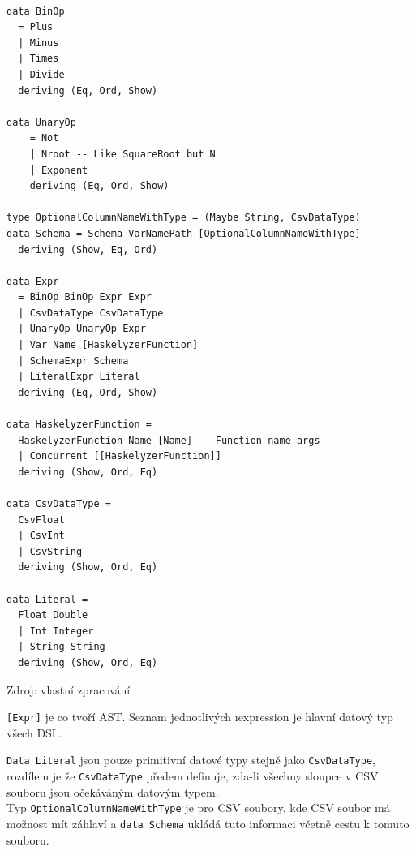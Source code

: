 \documentclass[male,czech]{kithesis}
\newcommand{\haskellInline}[1]{\colorbox{gray!10}{\texttt{#1}}}
\begin{document}
\begin{verbatim}

data BinOp
  = Plus
  | Minus
  | Times
  | Divide
  deriving (Eq, Ord, Show)

data UnaryOp
    = Not
    | Nroot -- Like SquareRoot but N 
    | Exponent
    deriving (Eq, Ord, Show)

type OptionalColumnNameWithType = (Maybe String, CsvDataType)
data Schema = Schema VarNamePath [OptionalColumnNameWithType] 
  deriving (Show, Eq, Ord)

data Expr
  = BinOp BinOp Expr Expr
  | CsvDataType CsvDataType 
  | UnaryOp UnaryOp Expr 
  | Var Name [HaskelyzerFunction]
  | SchemaExpr Schema 
  | LiteralExpr Literal
  deriving (Eq, Ord, Show)

data HaskelyzerFunction = 
  HaskelyzerFunction Name [Name] -- Function name args
  | Concurrent [[HaskelyzerFunction]]
  deriving (Show, Ord, Eq)

data CsvDataType = 
  CsvFloat 
  | CsvInt 
  | CsvString 
  deriving (Show, Ord, Eq)

data Literal = 
  Float Double 
  | Int Integer
  | String String
  deriving (Show, Ord, Eq)

\end{verbatim}

{
\begin{center}
Zdroj: vlastní zpracování
\end{center}
}

\haskellInline{[Expr]} je co tvoří AST.
Seznam jednotlivých \i{expression} je hlavní datový typ všech DSL. 

\haskellInline{Data Literal} jsou pouze primitivní datové typy stejně jako
\haskellInline{CsvDataType}, 
rozdílem je že \haskellInline{CsvDataType} předem definuje, 
zda-li všechny sloupce v CSV souboru jsou očekáváným datovým typem. \\
Typ \haskellInline{OptionalColumnNameWithType} je pro CSV soubory, 
kde CSV soubor má možnost
mít záhlaví a \haskellInline{data Schema} ukládá tuto informaci včetně cestu k tomuto souboru. 
\end{document}
